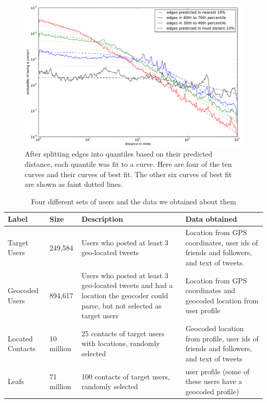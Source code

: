 \documentclass{sig-alternate}
\begin{document}
\begin{figure}[tb]
\centering
\includegraphics[width=.9\linewidth]{figures/vect_fit.pdf}
\caption{
After splitting edges into quantiles based on their predicted distance, each
quantile was fit to a curve.
%
Here are four of the ten curves and their curves of best
fit.
%
The other six curves of best fit are shown as faint dotted lines.}
\label{fig:NearProbFit}
\vspace{-2pt}
\end{figure}



\begin{table}[tb]
\scriptsize
\centering
\begin{tabular}{l l p{4cm} p{6cm}}
    Label & Size & Description & Data obtained \\
    \hline
    Target Users & 249,584 & Users who posted at least 3 geo-located tweets &
    Location from GPS coordinates, user ids of friends and followers,
    and text of tweets. \\
    Geocoded Users & 894,617 & Users who posted at least 3 geo-located tweets
    and had a location the geocoder could parse, but not selected as target users &
    Location from GPS coordinates and geocoded location from user profile \\
    Located Contacts & 10 million & 25 contacts of target users with locations, randomly selected &
    Geocoded location from profile, user ids of friends and followers, and text of tweets \\
    Leafs & 71 million & 100 contacts of target users, randomly selected &
    user profile (some of these users have a geocoded profile)\\
\end{tabular}
\caption{Four different sets of users and the data we obtained about them}
\label{tab:datasets}
\end{table}
\end{document}
